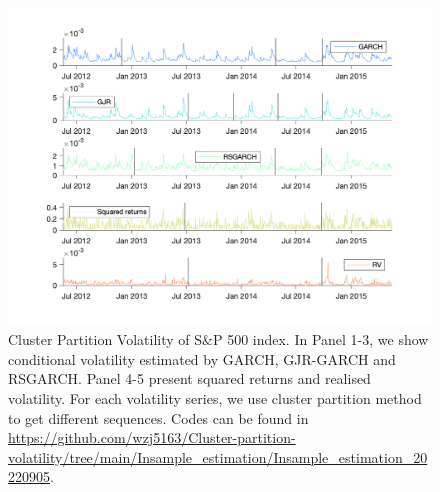 \documentclass[preprint,12pt,authoryear]{elsarticle}
\renewcommand{\thefigure}{\arabic{figure}}
\begin{document}
\newpage
\renewcommand{\thefigure}{\arabic{figure}}
\clearpage \setcounter{figure}{0}

\begin{figure}[htbp]
	\begin{center}
		\includegraphics[width=1\textwidth]{Peimin/Volatility_SP_CP_GARCH_GJR_RSGARCH.png}
		\caption{
		Cluster Partition Volatility of S\&P 500 index.
			In Panel 1-3, we show conditional volatility estimated by {\color{blue} GARCH}, {\color{cyan}GJR-GARCH} and {\color{green}RSGARCH}. Panel 4-5 present {\color{yellow}squared returns} and {\color{red}realised volatility}. For each volatility series, we use cluster partition method to get different sequences.
			Codes can be found in \url{https://github.com/wzj5163/Cluster-partition-volatility/tree/main/Insample_estimation/Insample_estimation_20220905}.
		}
		\label{fig13_sp} %
	\end{center}
\end{figure}
\end{document}

